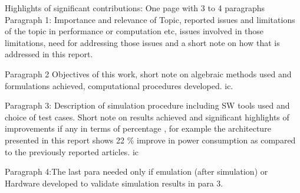 \vspace{-1cm}


Highlights of significant contributions: One page with 3 to 4 paragraphs\\

Paragraph 1: Importance and relevance of Topic, reported issues and limitations of the topic in performance or computation etc, issues involved in those limitations, need for addressing those issues and a short note on how that is addressed in this report.


Paragraph 2 Objectives of this work, short note on algebraic methods used and formulations achieved, computational procedures developed. \gls{ic}.


Paragraph 3: Description of simulation procedure including SW tools used and choice of test cases. Short note on results achieved and significant highlights of improvements if any in terms of percentage , for example the architecture presented in this report shows 22 \% improve in power consumption as compared to the previously reported articles.
\gls{ic}

Paragraph 4:The last para needed only if emulation (after simulation) or Hardware developed to validate simulation results in para 3. 

\pagebreak